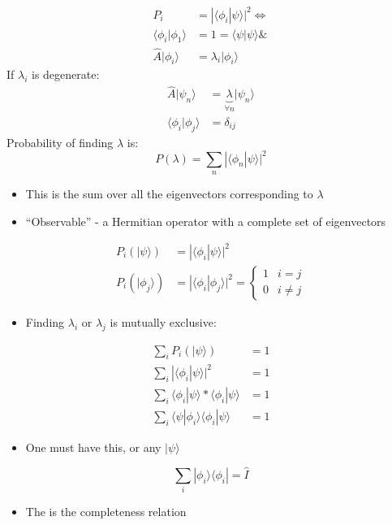 \documentclass[a4paper,11pt,normalem]{article}
\begin{document}
\[
    \begin{aligned}
    P_i &= |\langle\phi_i|\psi\rangle|^2 \iff \\
    \langle\phi_i|\phi_1\rangle &= 1 = \langle\psi|\psi\rangle \& \\
    \hat{A}|\phi_i\rangle &= \lambda_i|\phi_i\rangle
    \end{aligned}
\]
If \(\lambda_i\) is degenerate:
\[
    \begin{aligned}
    \hat{A}|\psi_n\rangle &= \underbrace{\lambda}_{\forall n}|\psi_n\rangle \\
    \langle\phi_i|\phi_j\rangle &= \delta_{ij}
    \end{aligned}
\]
Probability of finding \(\lambda\) is:
\[
    P(\lambda) = \sum_n |\langle\phi_n|\psi\rangle|^2
\]
\begin{itemize}
\item
  This is the sum over all the eigenvectors corresponding to \(\lambda\)
\item
  ``Observable'' - a Hermitian operator with a complete set of
  eigenvectors
\end{itemize}
\[
    \begin{aligned}
    P_i(|\psi\rangle) &= |\langle\phi_i|\psi\rangle|^2 \\
    P_i(|\phi_j\rangle) &= |\langle\phi_i|\phi_j\rangle|^2 = \begin{cases} 1 & i = j \\ 0 & i \neq j \end{cases}
    \end{aligned}
\]
\begin{itemize}
\item
  Finding \(\lambda_i\) or \(\lambda_j\) is mutually exclusive:
\end{itemize}
\[
    \begin{aligned}
    \sum_i P_i(|\psi\rangle) &= 1 \\
    \sum_i |\langle\phi_i|\psi\rangle|^2 &= 1 \\
    \sum_i \langle\phi_i|\psi\rangle * \langle\phi_i|\psi\rangle &= 1 \\
    \sum_i \langle\psi|\phi_i\rangle \langle\phi_i|\psi\rangle &= 1
    \end{aligned}
\]
\begin{itemize}
\item
  One must have this, or any \(|\psi\rangle\)
\end{itemize}
\[
    \sum_i |\phi_i\rangle\langle\phi_i| = \hat{I}
\]
\begin{itemize}
\item
  The is the completeness relation
\end{itemize}
\end{document}
